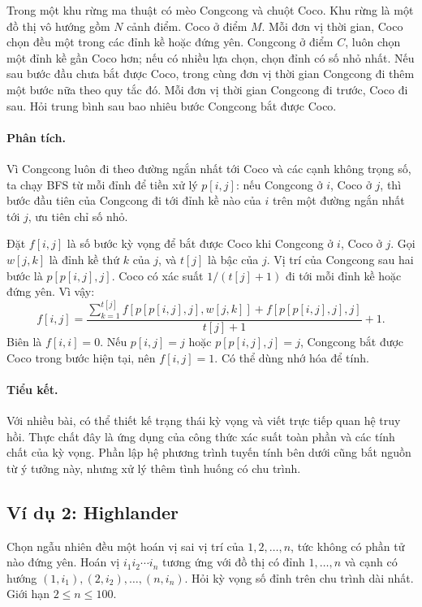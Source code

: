 \documentclass[11pt]{article}
\begin{document}
Trong một khu rừng ma thuật có mèo Congcong và chuột Coco. Khu rừng là một đồ
thị vô hướng gồm \(N\) cảnh điểm. Coco ở điểm \(M\). Mỗi đơn vị thời gian, Coco
chọn đều một trong các đỉnh kề hoặc đứng yên. Congcong ở điểm \(C\), luôn chọn
một đỉnh kề gần Coco hơn; nếu có nhiều lựa chọn, chọn đỉnh có số nhỏ nhất. Nếu
sau bước đầu chưa bắt được Coco, trong cùng đơn vị thời gian Congcong đi thêm
một bước nữa theo quy tắc đó. Mỗi đơn vị thời gian Congcong đi trước, Coco đi
sau. Hỏi trung bình sau bao nhiêu bước Congcong bắt được Coco.

\paragraph{Phân tích.}
Vì Congcong luôn đi theo đường ngắn nhất tới Coco và các cạnh không trọng số,
ta chạy BFS từ mỗi đỉnh để tiền xử lý \(p[i,j]\): nếu Congcong ở \(i\), Coco ở
\(j\), thì bước đầu tiên của Congcong đi tới đỉnh kề nào của \(i\) trên một
đường ngắn nhất tới \(j\), ưu tiên chỉ số nhỏ.

Đặt \(f[i,j]\) là số bước kỳ vọng để bắt được Coco khi Congcong ở \(i\), Coco
ở \(j\). Gọi \(w[j,k]\) là đỉnh kề thứ \(k\) của \(j\), và \(t[j]\) là bậc của
\(j\). Vị trí của Congcong sau hai bước là \(p[p[i,j],j]\). Coco có xác suất
\(1/(t[j]+1)\) đi tới mỗi đỉnh kề hoặc đứng yên. Vì vậy:
\[
  f[i,j]=
  \frac{
    \sum_{k=1}^{t[j]} f[p[p[i,j],j],w[j,k]]
    +f[p[p[i,j],j],j]
  }{t[j]+1}
  +1.
\]
Biên là \(f[i,i]=0\). Nếu \(p[i,j]=j\) hoặc \(p[p[i,j],j]=j\), Congcong bắt
được Coco trong bước hiện tại, nên \(f[i,j]=1\). Có thể dùng nhớ hóa để tính.

\paragraph{Tiểu kết.}
Với nhiều bài, có thể thiết kế trạng thái kỳ vọng và viết trực tiếp quan hệ
truy hồi. Thực chất đây là ứng dụng của công thức xác suất toàn phần và các
tính chất của kỳ vọng. Phần lập hệ phương trình tuyến tính bên dưới cũng bắt
nguồn từ ý tưởng này, nhưng xử lý thêm tình huống có chu trình.

\subsection{Ví dụ 2: Highlander}

Chọn ngẫu nhiên đều một hoán vị sai vị trí của \(1,2,\ldots,n\), tức không có
phần tử nào đứng yên. Hoán vị \(i_1i_2\cdots i_n\) tương ứng với đồ thị có
đỉnh \(1,\ldots,n\) và cạnh có hướng \((1,i_1),(2,i_2),\ldots,(n,i_n)\). Hỏi
kỳ vọng số đỉnh trên chu trình dài nhất. Giới hạn \(2\le n\le100\).
\end{document}
